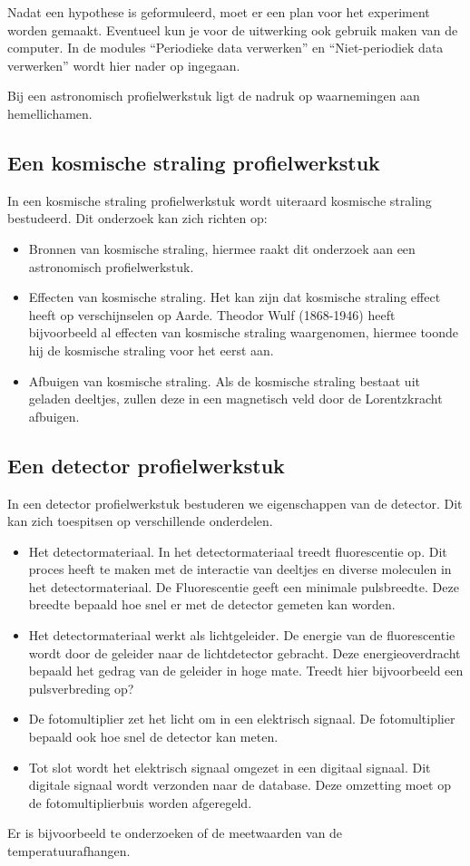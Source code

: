Nadat een hypothese is geformuleerd, moet er een plan voor het experiment
worden gemaakt. Eventueel kun je voor de uitwerking ook gebruik maken
van de computer. In de modules ``Periodieke data verwerken'' en
``Niet-periodiek data verwerken'' wordt hier nader op ingegaan.

Bij een astronomisch profielwerkstuk ligt de nadruk op waarnemingen
aan hemellichamen.


\subsection{Een kosmische straling profielwerkstuk}

In een kosmische straling profielwerkstuk wordt uiteraard kosmische
straling bestudeerd. Dit onderzoek kan zich richten op:
\begin{itemize}
\item Bronnen van kosmische straling, hiermee raakt dit onderzoek aan een
astronomisch profielwerkstuk.
\item Effecten van kosmische straling. Het kan zijn dat kosmische straling
effect heeft op verschijnselen op Aarde. Theodor Wulf (1868-1946)
heeft bijvoorbeeld al effecten van kosmische straling waargenomen,
hiermee toonde hij de kosmische straling voor het eerst aan.
\item Afbuigen van kosmische straling. Als de kosmische straling bestaat
uit geladen deeltjes, zullen deze in een magnetisch veld door de Lorentzkracht
afbuigen.
\end{itemize}

\subsection{Een detector profielwerkstuk}

In een detector profielwerkstuk bestuderen we eigenschappen van de
detector. Dit kan zich toespitsen op verschillende onderdelen. 
\begin{itemize}
\item Het detectormateriaal. In het detectormateriaal treedt fluorescentie
op. Dit proces heeft te maken met de interactie van deeltjes en diverse
moleculen in het detectormateriaal. De Fluorescentie geeft een minimale
pulsbreedte. Deze breedte bepaald hoe snel er met de detector gemeten
kan worden.
\item Het detectormateriaal werkt als lichtgeleider. De energie van de fluorescentie
wordt door de geleider naar de lichtdetector gebracht. Deze energieoverdracht
bepaald het gedrag van de geleider in hoge mate. Treedt hier bijvoorbeeld
een pulsverbreding op?
\item De fotomultiplier zet het licht om in een elektrisch signaal. De fotomultiplier
bepaald ook hoe snel de detector kan meten.
\item Tot slot wordt het elektrisch signaal omgezet in een digitaal signaal.
Dit digitale signaal wordt verzonden naar de database. Deze omzetting
moet op de fotomultiplierbuis worden afgeregeld.
\end{itemize}
Er is bijvoorbeeld te onderzoeken of de meetwaarden van de temperatuurafhangen.


